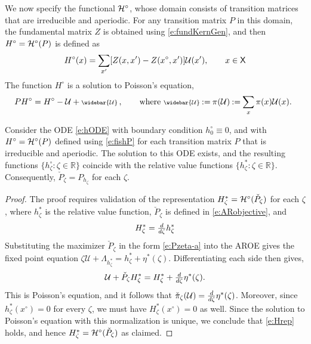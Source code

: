 \documentclass[final,12pt]{colt2018} %
\def\util{{\mathcal{U}}}
\def\meanutil{\mbox{\scriptsize$\widebar{\cal U}$}}
\def\xz{x^\circ}
\def\EFn#1{\Lambda_{#1}}
\def\preclH{{\cal H}^\circ}
\def\preH{H^\circ}  %
\def\state{{\sf X}}
\newcommand{\field}[1]{\mathbb{#1}}
\def\Re{\field{R}}
\def\cpi{\check{\pi}}
\def\cP{{\check{P}}}
\def\FRAC#1#2#3{\genfrac{}{}{}{#1}{#2}{#3}}
\def\ddzeta{{\mathchoice{\FRAC{1}{d}{d\zeta}}%
{\FRAC{1}{d}{d\zeta}}%
{\FRAC{3}{d}{d\zeta}}%
{\FRAC{3}{d}{d\zeta}}}}
\def\eqdef{\mathbin{:=}}
\def\Re{\field{R}}
\begin{document}
We now specify the functional  $\preclH$, whose domain consists of  transition matrices that are irreducible and aperiodic.    For  any transition matrix  $P$ in this domain, the fundamental matrix $Z$ is obtained using \eqref{e:fundKernGen}, and then $\preH=\preclH(P)$ is defined as
\begin{equation}
\preH(x) = \sum_{x'} [ Z(x,x')-Z(\xz,x') ] \util (x'),\qquad x\in\state
\label{e:fishP}
\end{equation}
The function $\preH$   is a solution to Poisson's equation,
\begin{equation}
P \preH =\preH -\util +\meanutil\,, \qquad \text{where $  \meanutil  \eqdef  \pi(\util)  \eqdef \sum_x\pi(x) \util(x)$.
}
\label{e:fish}
\end{equation}

  
\begin{theorem}
\label{t:IDPODE}
Consider the ODE 
\eqref{e:hODE}
with boundary condition $h_0^\circ\equiv 0$,
and with  $\preH=\preclH(P)$ defined using \eqref{e:fishP} for each transition matrix $P$
that is irreducible and aperiodic.
The solution to this ODE exists, and the resulting functions $\{ h^\circ_\zeta : \zeta\in\Re\}$    
coincide with the relative value functions $\{h^*_\zeta: \zeta\in\Re\}$.  Consequently,   $\cP_\zeta = P_{h_\zeta}$ for each $\zeta$.
\end{theorem}


 
\begin{proof}
The proof requires validation of the representation $  H^*_\zeta = \preclH(\cP_\zeta)$ for each $\zeta$, where $h^*_\zeta$ is the relative value function, 
$\cP_\zeta$ is defined in \eqref{e:ARobjective}, and
\begin{equation}
  H^*_\zeta =\ddzeta h^*_\zeta 
\label{e:Hrep}
\end{equation} 
Substituting the maximizer $\cP_\zeta$ in the form \eqref{e:Pzeta-a} into the AROE gives the fixed point equation $ \zeta \util   + \EFn{h^*_\zeta} = h^*_\zeta + \eta^*(\zeta) $.
%
Differentiating each side   then gives,
\begin{equation}
   \util   +  \cP_\zeta H^*_\zeta= H^*_\zeta + \ddzeta \eta^*(\zeta) .
\label{e:fisheta}
\end{equation}
This is Poisson's equation, and it follows that $\cpi_\zeta(\util) =  \ddzeta \eta^*(\zeta) $.  Moreover,  since $h^*_\zeta(\xz)=0$ for every $\zeta$,  we must have $H^*_\zeta(\xz)=0$ as well.  Since the solution to Poisson's equation with this normalization is unique, we conclude that  \eqref{e:Hrep} holds, and hence $H^*_\zeta = \preclH(\cP_\zeta)$ as claimed.  
\end{proof}
\end{document}

